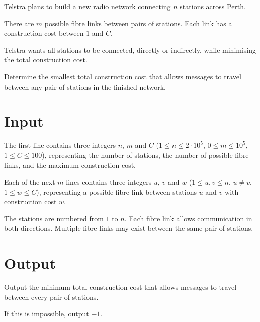 
Telstra plans to build a new radio network connecting $n$ stations across Perth.

There are $m$ possible fibre links between pairs of stations. Each link has a
construction cost between $1$ and $C$.

Telstra wants all stations to be connected, directly or indirectly, while
minimising the total construction cost.

Determine the smallest total construction cost that allows messages to travel
between any pair of stations in the finished network.

\section*{Input}

The first line contains three integers $n$, $m$ and $C$
($1 \le n \le 2\cdot 10^5$, $0 \le m \le 10^5$, $1 \le C \le 100$),
representing the number of stations, the number of possible fibre links,
and the maximum construction cost.

Each of the next $m$ lines contains three integers $u$, $v$ and $w$
($1 \le u,v \le n$, $u \ne v$, $1 \le w \le C$),
representing a possible fibre link between stations $u$ and $v$
with construction cost $w$.

The stations are numbered from $1$ to $n$.
Each fibre link allows communication in both directions.
Multiple fibre links may exist between the same pair of stations.

\section*{Output}

Output the minimum total construction cost that allows messages
to travel between every pair of stations.

If this is impossible, output $-1$.